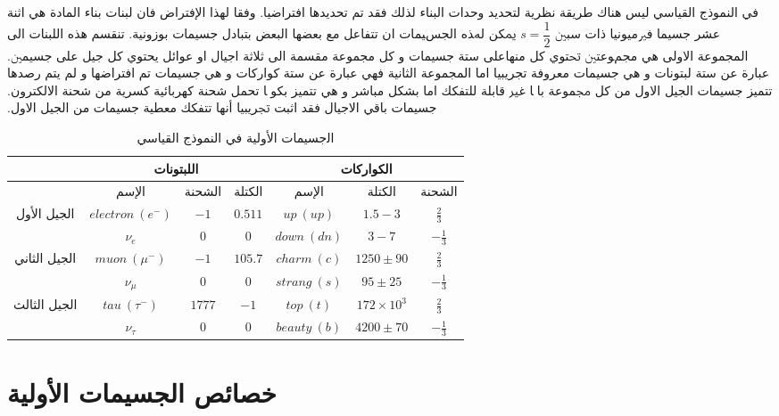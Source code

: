 ‫في ‬‫ﺍﻟﻨﻤﻮﺫﺝ‬ ‫ﺍﻟﻘﻴﺎﺳﻲ‬ ‫ﻟﻴﺲ‬ ‫ﻫﻨﺎﻙ‬ ‫ﻃﺮﻳﻘﺔ‬ ‫ﻧﻈﺮﻳﺔ‬ ‫ﻟﺘﺤﺪﻳﺪ‬ ‫ﻭﺣﺪﺍﺕ‬ ‫ﺍﻟﺒﻨﺎء‬ ‫ﻟﺬﻟﻚ‬ ‫ﻓﻘﺪ‬ تم‬ تحدﻳﺪﻫﺎ‬ ‫ﺍﻓﺘﺮﺍﺿﻴﺎ‫‪.‬‬ ‫ﻭﻓﻘﺎ لهذا الإفتراض ‫ﻓﺎﻥ‬ ‫ﻟﺒﻨﺎﺕ‬ ‫ﺑﻨﺎء‬ ‫ﺍلمادة‬ ‫ﻫﻲ‬ ‫ﺍﺛﻨﺔ‬ ‫ﻋﺸﺮ‬ ‫ﺟﺴﻴﻤﺎ‬ ‫ﻓﲑﻣﻴﻮﻧﻴﺎ‬ ‫ﺫﺍﺕ‬ ‫ﺳﺒﲔ $s=\dfrac{1}{2}$‬‬ ‫ﳝﻜﻦ لهﺬﻩ‬ ‫ﺍلجسﻴﻤﺎﺕ‬ ‫ﺍﻥ‬ ‫ﺗﺘﻔﺎﻋﻞ‬ ‫ﻣﻊ‬ ‫ﺑﻌﻀﻬﺎ‬ ‫ﺍﻟﺒﻌﺾ‬ ‫ﺑﺘﺒﺎﺩﻝ‬ ‫ﺟﺴﻴﻤﺎﺕ‬ ‫ﺑﻮﺯﻭﻧﻴﺔ‬‫‪.‬‬ ‫ﺗﻨﻘﺴﻢ‬ ‫ﻫﺬﻩ‬ ‫ﺍﻟﻠﺒﻨﺎﺕ‬ الى مجمﻮﻋﺘﲔ‬ ‫ﲢﺘﻮﻱ‬ ‫ﻛﻞ‬ ‫ﻣﻨﻬﺎ‬‫ﻋﻠﻰ‬ ‫ﺳﺘﺔ‬ ‫ﺟﺴﻴﻤﺎﺕ‬ ‫ﻭ‬ ‫ﻛﻞ مجموﻋﺔ‬ ‫ﻣﻘﺴﻤﺔ‬ الى‬ ‫ﺛﻼﺛﺔ‬ ‫ﺍﺟﻴﺎﻝ‬ ‫ﺍﻭ‬ ‫ﻋﻮﺍﺋﻞ‬ يحتوي‬ ‫ﻛﻞ‬ ‫ﺟﻴﻞ‬ ‫ﻋﻠﻰ‬ ‫ﺟﺴﻴﻤﲔ‬‫‪.‬‬ ‫ﺍلمجموﻋﺔ‬ ‫ﺍﻻﻭلى ‫ﻫﻲ ‬‫ﻋﺒﺎﺭﺓ‬ ‫عن ﺳﺘﺔ‬ ‫ﻟﺒﺘﻮﻧﺎﺕ‬ ‫ﻭ‬ ‫ﻫﻲ‬ ‫ﺟﺴﻴﻤﺎﺕ‬ ‫ﻣﻌﺮﻭﻓﺔ‬ تجرﻳﺒﻴﺎ‬ ‫ﺍﻣﺎ‬ ‫ﺍلمجموعة ‫ﺍﻟﺜﺎﻧﻴﺔ‬ ‫ﻓﻬﻲ‬ ‫ﻋﺒﺎﺭﺓ‬ ‫ﻋﻦ‬ ‫ﺳﺘﺔ‬ ‫ﻛﻮﺍﺭﻛﺎﺕ‬ ‫ﻭ‬ ‫ﻫﻲ‬ ‫ﺟﺴﻴﻤﺎﺕ‬ تم ‬‫ﺍﻓﺘﺮﺍﺿﻬﺎ‬ ‫ﻭ‬ لم‬ ‫ﻳﺘﻢ‬ ‫ﺭﺻﺪﻫﺎ‬ ‫ﺑﺸﻜﻞ‬ ‫ﻣﺒﺎﺷﺮ‬ ‫ﻭ‬ ‫ﻫﻲ‬ ‫ﺗﺘﻤﻴﺰ‬ ‫ﺑﻜﻮ‪‬ﺎ‬ تحمل‬ ‫ﺷﺤﻨﺔ‬ ‫ﻛﻬﺮﺑﺎﺋﻴﺔ‬ ‫ﻛﺴﺮﻳﺔ‬ ‫ﻣﻦ‬ ‫ﺷﺤﻨﺔ‬ ‫ﺍﻻﻟﻜﺘﺮﻭﻥ‬‫‪.‬‬ ‫ﺗﺘﻤﻴﺰ‬ ‫ﺟﺴﻴﻤﺎﺕ الجيل ‫ﺍﻻﻭﻝ‬ ‫ﻣﻦ‬ ‫ﻛﻞ‬ ‫ﳎﻤﻮﻋﺔ‬ ‫ﺑﺎ‪‬ﺎ‬ ‫ﻏﲑ‬ ‫ﻗﺎﺑﻠﺔ‬ ‫ﻟﻠﺘﻔﻜﻚ‬ ‫ﺍﻣﺎ‬ ‫ﺟﺴﻴﻤﺎﺕ‬ ‫ﺑﺎﻗﻲ‬ ‫ﺍﻻﺟﻴﺎﻝ‬ ‫ﻓﻘﺪ‬ ‫ﺍﺛﺒﺖ‬ ‫ﲡﺮﻳﺒﻴﺎ‬ أنها‬ ‫ﺗﺘﻔﻜﻚ‬ ‫ﻣﻌﻄﻴﺔ‬ ‫ﺟﺴﻴﻤﺎﺕ ‬‫ﻣﻦ‬ الجيل‬ ‫ﺍﻻﻭﻝ‬‫‪.‬‬
\begin{table}
	\centering
\begin{tabular}{|c|c|c|c|c|c|c|}
	\hline
	& \multicolumn{3}{c|}{اللبتونات} &  \multicolumn{3}{c|}{الكواركات} \\
	\hline
	& الإسم & الشحنة & الكتلة & الإسم  & الكتلة  &  الشحنة \\
	\hline
	 الجيل الأول  & $electron~(e^{-})$  & $-1$  & $0.511$ & $up~(up)$ & $1.5-3$& $\frac{2}{3}$ \\
	 
	 & $\nu_{e}$  & $0$ & $0$ &  $down~(dn)$ & $3-7$ & $-\frac{1}{3}$ \\
	 
	\hline
	 الجيل الثاني  & $muon~(\mu^{-}) $  & $-1$ & $105.7$  &  $charm~(c)$ & $1250\pm 90$ & $\frac{2}{3}$ \\
	 
	 & $\nu_{\mu}$ & $0$ & $0$ &  $strang~(s)$ & $95\pm 25$  & $-\frac{1}{3}$ \\
	 
	\hline
	 الجيل الثالث  & $tau~(\tau^{-})$  & $1777$ & $-1$ &$top~(t)$   & $172\times 10^{3}$  &  $\frac{2}{3}$ \\
	  
	  & $\nu_{\tau} $  & $0$ & $0$ &  $beauty~(b)$ &$4200 \pm 70 $  & $ -\frac{1}{3}$ \\
	\hline
\end{tabular}
\caption{‫ﺍﻟجسيمات اﻷولية في ‫ﺍﻟﻨﻤﻮﺫﺝ‬ ‫ﺍﻟﻘﻴﺎﺳﻲ‬}
\label{tab1}
\end{table}

\section{خصائص الجسيمات اﻷولية}

